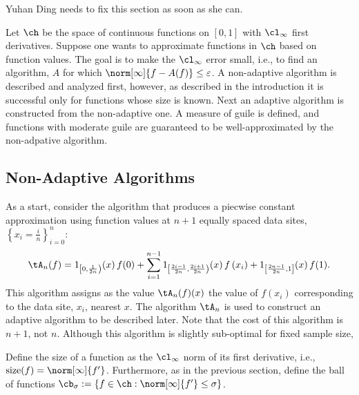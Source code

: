 Yuhan Ding needs to fix this section as soon as she can.

Let $\ch$ be the space of continuous functions on $[0,1]$ with $\cl_{\infty}$ first derivatives.  Suppose one wants to approximate functions in $\ch$ based on function values.  The goal is to make the $\cl_{\infty}$ error small, i.e., to find an algorithm, $A$ for which $\norm[\infty]{f - A(f)} \le \varepsilon$.  A non-adaptive algorithm is described and analyzed first, however, as described in the introduction it is successful only for functions whose size is known.  Next an adaptive algorithm is constructed from the non-adaptive one.  A measure of guile is defined, and functions with moderate guile are guaranteed to be well-approximated by the non-adpative algorithm.

\subsection{Non-Adaptive Algorithms} As a start, consider the algorithm that produces a piecwise constant approximation using function values at $n+1$ equally spaced data sites, $\left\{x_i = \frac{i}{n}\right\}_{i=0}^n$:
\begin{equation} \label{appxbuildblock}
\tA_n(f) = 1_{\left[0,\frac{1}{2n}\right)}(x) \, f(0) + \sum_{i=1}^{n-1} 1_{\left[\frac{2i-1}{2n},\frac{2i+1}{2n}\right)}(x) \, f\left(x_i\right) + 1_{\left[\frac{2n-1}{2n},1\right]}(x) \, f(1).
\end{equation}
This algorithm assigns as the value $\tA_n(f)(x)$ the value of $f\left(x_i\right)$ corresponding to the data site, $x_i$, nearest $x$.  The algorithm $\tA_n$ is used to construct an adaptive algorithm to be described later.  Note that the cost of this algorithm is $n+1$, not $n$.  Although this algorithm is slightly sub-optimal for fixed sample size, 

Define the size of a function as the $\cl_{\infty}$ norm of its first derivative, i.e., $\size(f) = \norm[\infty]{f'}$. Furthermore, as in the previous section, define the ball of functions $\cb_{\sigma} :=\{f \in \ch : \norm[\infty]{f'} \le \sigma\}$.

